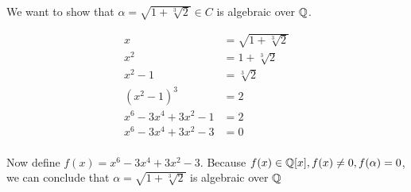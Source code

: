 \documentclass{article}
\begin{document}
\makehwtitle

\begin{problem}[29.4]
    We want to show that $\alpha = \sqrt{1+\sqrt[3]{2}} \in C$ is algebraic over $\mathbb{Q}$. 
\end{problem}


\begin{solution}

    \begin{align*}
        x &= \sqrt{1 +\sqrt[3]{2}} \\
        x^2 &= 1 + \sqrt[3]{2} \\
        x^2 - 1 &= \sqrt[3]{2} \\
        (x^2 - 1)^3 &= 2 \\
        x^6 - 3x^4 + 3x^2 - 1 &= 2 \\
        x^6 - 3x^4 + 3x^2 - 3 &= 0 \\
    \end{align*}
    
    Now define $f(x) = x^6 - 3x^4 + 3x^2 - 3$. Because $f(x) \in \mathbb{Q}[x], f(x) \neq 0, f(\alpha) = 0$, we can conclude that $\alpha = \sqrt{1 + \sqrt[3]{2}}$ is algebraic over $\mathbb{Q}$

\end{solution}
\end{document}
